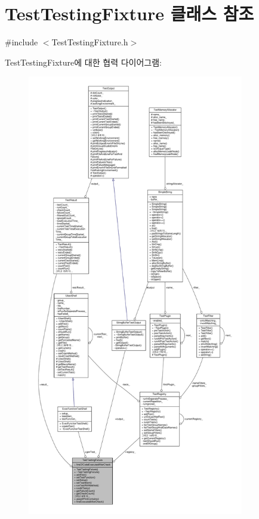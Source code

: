 \hypertarget{class_test_testing_fixture}{}\section{Test\+Testing\+Fixture 클래스 참조}
\label{class_test_testing_fixture}


{\ttfamily \#include $<$Test\+Testing\+Fixture.\+h$>$}



Test\+Testing\+Fixture에 대한 협력 다이어그램\+:
\nopagebreak
\begin{figure}[H]
\begin{center}
\leavevmode
\includegraphics[height=550pt]{class_test_testing_fixture__coll__graph}
\end{center}
\end{figure}
